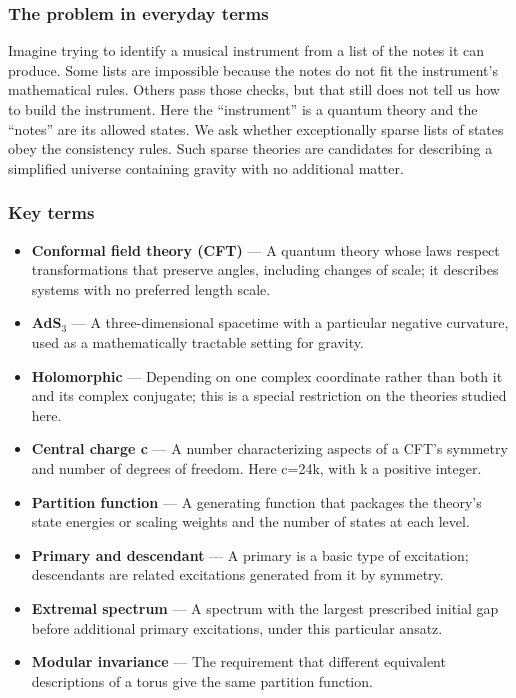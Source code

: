 \documentclass[
  11pt,
]{article}
\begin{document}
\subsubsection{The problem in everyday terms}

Imagine trying to identify a musical instrument from a list of the notes
it can produce. Some lists are impossible because the notes do not fit
the instrument's mathematical rules. Others pass those checks, but that
still does not tell us how to build the instrument. Here the
``instrument'' is a quantum theory and the ``notes'' are its allowed
states. We ask whether exceptionally sparse lists of states obey the
consistency rules. Such sparse theories are candidates for describing a
simplified universe containing gravity with no additional matter.

\subsubsection{Key terms}

\begin{itemize}
\item
  \textbf{Conformal field theory (CFT)} --- A quantum theory whose laws
  respect transformations that preserve angles, including changes of
  scale; it describes systems with no preferred length scale.
\item
  \textbf{AdS\ensuremath{{}_{3}}} --- A three-dimensional spacetime with
  a particular negative curvature, used as a mathematically tractable
  setting for gravity.
\item
  \textbf{Holomorphic} --- Depending on one complex coordinate rather
  than both it and its complex conjugate; this is a special restriction
  on the theories studied here.
\item
  \textbf{Central charge c} --- A number characterizing aspects of a
  CFT's symmetry and number of degrees of freedom. Here c=24k, with k a
  positive integer.
\item
  \textbf{Partition function} --- A generating function that packages
  the theory's state energies or scaling weights and the number of
  states at each level.
\item
  \textbf{Primary and descendant} --- A primary is a basic type of
  excitation; descendants are related excitations generated from it by
  symmetry.
\item
  \textbf{Extremal spectrum} --- A spectrum with the largest prescribed
  initial gap before additional primary excitations, under this
  particular ansatz.
\item
  \textbf{Modular invariance} --- The requirement that different
  equivalent descriptions of a torus give the same partition function.
\end{itemize}
\end{document}
